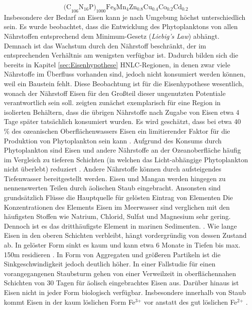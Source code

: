 \documentclass[12pt,a4paper,onecolumn]{scrartcl}
\begin{document}
\begin{equation}
\text{(C}_{106} \text{N}_{16} \text{P)}_{1000} \text{Fe}_8\text{Mn}_4\text{Zn}_{0.8}\text{Cu}_{0.4}\text{Co}_{0.2} \text{Cd}_{0.2}
\end{equation}
Insbesondere der Bedarf an Eisen kann je nach Umgebung höchst unterschiedlich sein. Es wurde beobachtet, dass die Entwicklung des Phytoplanktons von allen Nährstoffen entsprechend dem Minimum-Gesetz (\textit{Liebig's Law}) abhängt. Demnach ist das Wachstum durch den Nährstoff beschränkt, der im entsprechenden Verhältnis am wenigsten verfügbar ist. Dadurch bilden sich die bereits in Kapitel \ref{sec:Eisenhypothese} HNLC-Regionen, in denen zwar viele Nährstoffe im Überfluss vorhanden sind, jedoch nicht konsumiert werden können, weil ein Baustein fehlt. Diese Beobachtung ist für die Eisenhypothese wesentlich, wonach der Nährstoff Eisen für den Großteil dieser ungenutzten Potentiale verantwortlich sein soll. \citet{Martin.1988} zeigten zunächst exemplarisch für eine Region in isolierten Behältern, dass die übrigen Nährstoffe nach Zugabe von Eisen etwa 4 Tage später tatsächlich konsumiert wurden. Es wird geschätzt, dass bei etwa 40 \% des ozeanischen Oberflächenwassers Eisen ein limitierender Faktor für die Produktion von Phytoplankton sein kann \citep{Emerson.2009}. Aufgrund des Konsums durch Phytoplankton sind Eisen und andere Nährstoffe  an der Ozeanoberfläche häufig im Vergleich zu tieferen Schichten (in welchen das Licht-abhängige Phytoplankton nicht überlebt) reduziert \citep{Martin.1990}. Andere Nährstoffe  können durch aufsteigendes Tiefenwasser bereitgestellt werden. Eisen und Mangan werden hingegen zu nennenswerten Teilen durch äolischen Staub eingebracht. Ansonsten sind grundsätzlich Flüsse die Hauptquelle für gelösten Eintrag von Elementen \citep{Emerson.2009} Die Konzentrationen des Elements Eisen im Meerwasser sind verglichen mit den häufigsten Stoffen wie Natrium, Chlorid, Sulfat und Magnesium sehr gering. Dennoch ist es das dritthäufigste Element in marinen Sedimenten. \citep{Emerson.2009}. Wie lange Eisen in den oberen Schichten verbleibt, hängt vordergründig von dessen Zustand ab. In gelöster Form sinkt es kaum und kann etwa 6 Monate in Tiefen bis max. 150m residieren \citep{Hayes.2015}. In Form von Aggregaten und größeren Partikeln ist die Sinkgeschwindigkeit jedoch deutlich höher. In einer Fallstudie für einen vorangegangenen Staubsturm gehen \citet{Boyd.2010} von einer Verweilzeit in oberflächennahen Schichten von 30 Tagen für äolisch eingebrachtes Eisen aus. Darüber hinaus ist Eisen nicht in jeder Form biologisch verfügbar. Insbesondere innerhalb von Staub kommt Eisen in der kaum löslichen Form Fe$^\text{3+}$ vor anstatt des gut löslichen Fe$^\text{2+}$ \citep{Reynolds.2014}. \\
\end{document}
